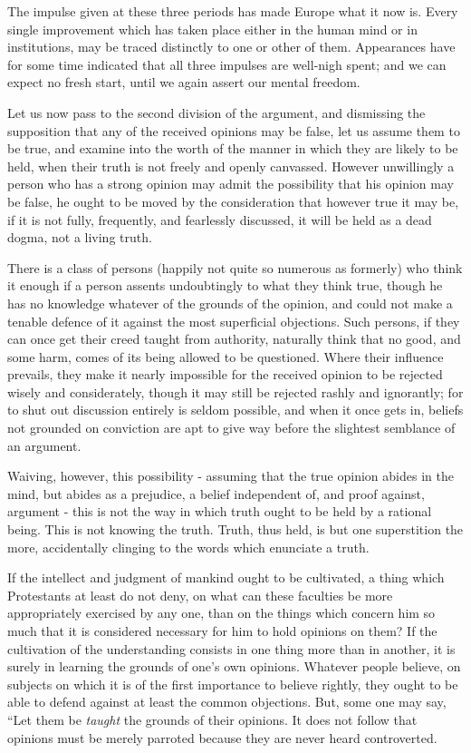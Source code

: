 The impulse given at these three periods has made Europe what it now is. Every single improvement which has taken place either in the human mind or in institutions, may be traced distinctly to one or other of them. Appearances have for some time indicated that all three impulses are well-nigh spent; and we can expect no fresh start, until we again assert our mental freedom.\par

Let us now pass to the second division of the argument, and dismissing the supposition that any of the received opinions may be false, let us assume them to be true, and examine into the worth of the manner in which they are likely to be held, when their truth is not freely and openly canvassed. However unwillingly a person who has a strong opinion may admit the possibility that his opinion may be false, he ought to be moved by the consideration that however true it may be, if it is not fully, frequently, and fearlessly discussed, it will be held as a dead dogma, not a living truth.\par

There is a class of persons (happily not quite so numerous as formerly) who think it enough if a person assents undoubtingly to what they think true, though he has no knowledge whatever of the grounds of the opinion, and could not make a tenable defence of it against the most superficial objections. Such persons, if they can once get their creed taught from authority, naturally think that no good, and some harm, comes of its being allowed to be questioned. Where their influence prevails, they make it nearly impossible for the received opinion to be rejected wisely and considerately, though it may still be rejected rashly and ignorantly; for to shut out discussion entirely is seldom possible, and when it once gets in, beliefs not grounded on conviction are apt to give way before the slightest semblance of an argument.\par

Waiving, however, this possibility - assuming that the true opinion abides in the mind, but abides as a prejudice, a belief independent of, and proof against, argument - this is not the way in which truth ought to be held by a rational being. This is not knowing the truth. Truth, thus held, is but one superstition the more, accidentally clinging to the words which enunciate a truth.\par

If the intellect and judgment of mankind ought to be cultivated, a thing which Protestants at least do not deny, on what can these faculties be more appropriately exercised by any one, than on the things which concern him so much that it is considered necessary for him to hold opinions on them? If the cultivation of the understanding consists in one thing more than in another, it is surely in learning the grounds of one’s own opinions. Whatever people believe, on subjects on which it is of the first importance to believe rightly, they ought to be able to defend against at least the common objections. But, some one may say, “Let them be \textit{taught} the grounds of their opinions. It does not follow that opinions must be merely parroted because they are never heard controverted.\par

